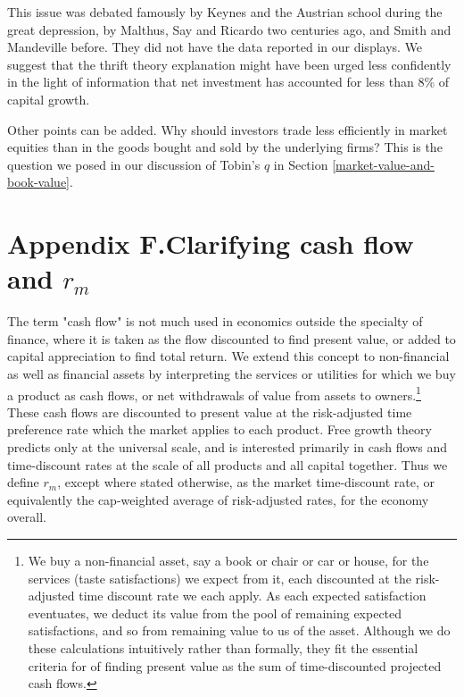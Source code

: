 \documentclass[a4padisinvitingper,fleqn]{latex_styles/cas-sc}
\begin{document}
This issue was debated famously by Keynes and the Austrian school during the great depression, by Malthus, Say and Ricardo two centuries ago, and Smith and Mandeville before. They did not have the data reported in our displays. We suggest that the thrift theory explanation might have been urged less confidently in the light of information that net investment has accounted for less than 8\% of capital growth.

Other points can be added. Why should investors trade less efficiently in market equities than in the goods bought and sold by the underlying firms? This is the question we posed in our discussion of Tobin's \(q\) in Section \ref{market-value-and-book-value}.

\renewcommand{\theequation}{F.\arabic{equation}}
\setcounter{equation}{0}

\hypertarget{appendix-f}{%
\section*{Appendix F.\hspace{0.5em}Clarifying cash flow and \(r_m\)}\label{appendix-f}}

The term "cash flow" is not much used in economics outside the specialty of finance, where it is taken as the flow discounted to find present value, or added to capital appreciation to find total return. We extend this concept to non-financial as well as financial assets by interpreting the
services or utilities for which we buy a product as cash flows, or net withdrawals of value from assets to owners.\footnote{We buy a non-financial asset, say a book or chair or car or house, for the services (taste satisfactions) we expect from it, each discounted at the risk-adjusted time discount rate we each apply. As each expected satisfaction eventuates, we deduct its value from the pool of remaining expected satisfactions, and so from remaining value to us of the asset. Although we do these calculations intuitively rather than formally, they fit the essential criteria for of finding present value as the sum of time-discounted projected cash flows.} These cash flows are discounted to present value at the risk-adjusted time preference rate which the market applies to each product. Free growth theory predicts only at the universal scale, and is interested primarily in cash flows and time-discount rates at the scale of all products and all capital together. Thus we define \(r_m\), except where stated otherwise, as the market time-discount rate, or equivalently the cap-weighted average of risk-adjusted rates, for the economy overall.
\end{document}
